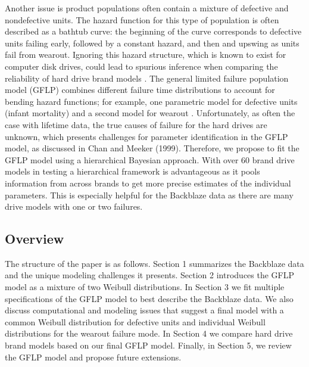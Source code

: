 \documentclass[12pt]{article}
\begin{document}
Another issue is product populations often contain a mixture of defective and nondefective units.  The hazard function for this type of population is often described as a bathtub curve: the beginning of the curve corresponds to defective units failing early, followed by a constant hazard, and then and upswing as units fail from wearout.  Ignoring this hazard structure, which is known to exist for computer disk drives, could lead to spurious inference when comparing the reliability of hard drive brand models \cite{chan}.  The general limited failure population model (GFLP) combines different failure time distributions to account for bending hazard functions; for example, one parametric model for defective units (infant mortality) and a second model for wearout \cite{chan}.  Unfortunately, as often the case with lifetime data, the true causes of failure for the hard drives are unknown, which presents challenges for parameter identification in the GFLP model, as discussed in Chan and Meeker (1999).  Therefore, we propose to fit the GFLP model using a hierarchical Bayesian approach.  With over 60 brand drive models in testing a hierarchical framework is advantageous as it pools information from across brands to get more precise estimates of the individual parameters.  This is especially helpful for the Backblaze data as there are many drive models with one or two failures.

\subsection{Overview}
The structure of the paper is as follows.  Section 1 summarizes the Backblaze data and the unique modeling challenges it presents.  Section 2 introduces the GFLP model as a mixture of two Weibull distributions.  In Section 3 we fit multiple specifications of the GFLP model to best describe the Backblaze data.  We also discuss computational and modeling issues that suggest a final model with a common Weibull distribution for defective units and individual Weibull distributions for the wearout failure mode.  In Section 4 we compare hard drive brand models based on our final GFLP model.  Finally, in Section 5, we review the GFLP model and propose future extensions.
\end{document}
